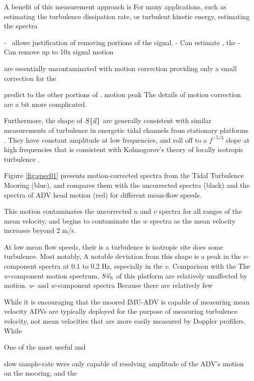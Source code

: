 \documentclass[twocol]{ametsoc}
\begin{document}
A benefit of this measurement approach is 
For many applications, such as estimating the turbulence dissipation rate, or turbulent kinetic energy, estimating the spectra 

- \uhead\ allows justification of removing portions of the signal.
- Can estimate \epsilon, tke
- Can remove up to 10x signal motion


are essentially uncontaminated with motion correction providing only a small correction for the 

predict to the other portions of . motion peak    The details of motion correction are a bit more complicated. 

Furthermore, the shape of $S\{\vec{u}\}$ are generally consistent with similar measurements of turbulence in energetic tidal channels from stationary platforms \citep[]{Thomson++2010} . They have constant amplitude at low frequencies, and roll off to a $f^{-5/3}$ slope at high frequencies that is consistent with Kolmogorov's theory of locally isotropic turbulence . 



Figure \ref{fig:spec01} presents motion-corrected spectra from the Tidal Turbulence Mooring (blue), and compares them with the uncorrected spectra (black) and the spectra of ADV head motion (red) for different mean-flow speeds.  

This motion contaminates the uncorrected $u$ and $v$ spectra for all ranges of the mean velocity, and begins to contaminate the $w$ spectra as the mean velocity increases beyond 2 m/s. 

At low mean flow speeds, their is a  turbulence is isotropic  site does some turbulence. 
Most notably, A notable deviation from this shape is a peak in the $v$-component spectra at 0.1 to 0.2 Hz, especially in the $v$. Comparison with the  The $w$-component motion spectrum, $S{\vec{u}_\mathrm{h}}$ of this platform are relatively unaffected by motion. $u$- and $w$-component spectra Because there are relatively few 

While it is encouraging that the moored IMU-ADV is capable of measuring mean velocity ADVs are typically deployed for the purpose of measuring turbulence velocity, not mean velocities that are more easily measured by Doppler profilers. While 



One of the most useful and 

slow sample-rate   were only capable of resolving  amplitude of the ADV's motion on the mooring, and the  \cite{Harding_MotionPaper}
\end{document}
